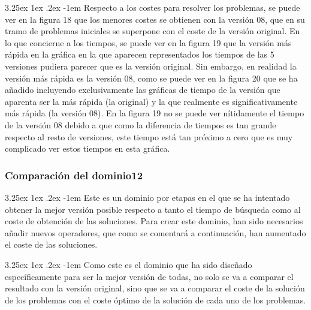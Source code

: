 \documentclass{article}
\makeatletter
\renewcommand\paragraph{\@startsection{paragraph}{5}{\z@}%
      {3.25ex \@plus1ex \@minus.2ex}%
      {-1em}%
      {\normalfont\normalsize\bfseries}}
\makeatother
\begin{document}
    \paragraph{}
    Respecto a los costes para resolver los problemas, se puede ver en la figura 18 que los menores costes se obtienen con la versión 08, que en su tramo de problemas iniciales se superpone con el coste de la versión original. En lo que concierne a los tiempos, se puede ver en la figura 19 que la versión más rápida en la gráfica en la que aparecen representados los tiempos de las 5 versiones pudiera parecer que es la versión original. Sin embargo, en realidad la versión más rápida es la versión 08, como se puede ver en la figura 20 que se ha añadido incluyendo exclusivamente las gráficas de tiempo de la versión que aparenta ser la más rápida (la original) y la que realmente es significativamente más rápida (la versión 08). En la figura 19 no se puede ver nítidamente el tiempo de la versión 08 debido a que como la diferencia de tiempos es tan grande respecto al resto de versiones, este tiempo está tan próximo a cero que es muy complicado ver estos tiempos en esta gráfica.
    
    \subsubsection{Comparación del dominio12}
    
    \paragraph{}
    Este es un dominio por etapas en el que se ha intentado obtener la mejor versión posible respecto a tanto el tiempo de búsqueda como al coste de obtención de las soluciones. Para crear este dominio, han sido necesarios añadir nuevos operadores, que como se comentará a continuación, han aumentado el coste de las soluciones.
    
    \paragraph{}
    Como este es el dominio que ha sido diseñado específicamente para ser la mejor versión de todas, no solo se va a comparar el resultado con la versión original, sino que se va a comparar el coste de la solución de los problemas con el coste óptimo de la solución de cada uno de los problemas.
    
\end{document}
